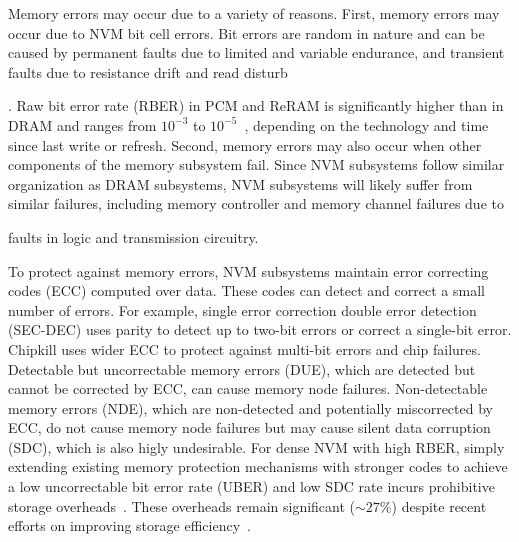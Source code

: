 Memory errors may occur due to a variety of reasons.
First, memory errors may occur due to NVM bit cell errors. 
Bit errors are random in nature and can be caused by permanent faults due to limited and variable endurance, and transient faults due to resistance drift and read disturb. 
Raw bit error rate (RBER) in PCM and ReRAM is significantly higher than in DRAM and ranges from $10^{-3}$ to $10^{-5}$~\cite{zhang:pm-chipkill:micro:2018}, depending on the technology and time since last write or refresh.
%
Second, memory errors may also occur when other components of the memory subsystem fail. 
Since NVM subsystems follow similar organization as DRAM subsystems, NVM subsystems will likely suffer from similar failures, including memory controller and memory channel failures due to 
faults in logic and transmission circuitry. 

To protect against memory errors, NVM subsystems maintain error correcting codes (ECC) computed over data. 
These codes can detect and correct a small number of errors.
For example, single error correction double error detection (SEC-DEC) uses parity to detect up to two-bit errors or correct a single-bit error.
Chipkill uses wider ECC to protect against multi-bit errors and chip failures.
Detectable but uncorrectable memory errors (DUE), which are detected but cannot be corrected by ECC, can cause memory node failures.
Non-detectable memory errors (NDE), which are non-detected and potentially miscorrected by ECC, do not cause memory node failures but may cause silent data corruption (SDC), which is also higly undesirable. 
For dense NVM with high RBER, simply extending existing memory protection mechanisms with stronger codes to achieve a low uncorrectable bit error rate (UBER) and low SDC rate incurs prohibitive storage overheads~\cite{zhang:pm-chipkill:micro:2018}.
These overheads remain significant ($\sim27\%$) despite recent efforts on improving storage
efficiency~\cite{zhang:pm-chipkill:micro:2018}. 

